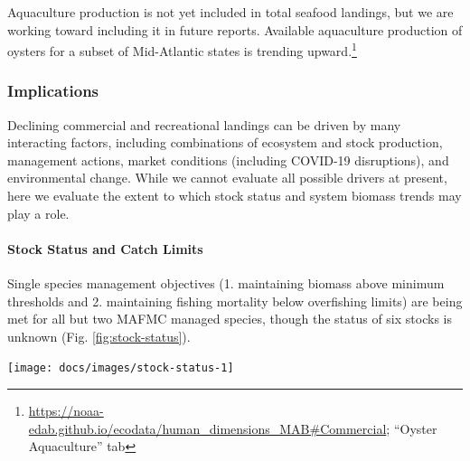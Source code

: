 \documentclass[
  10pt,
]{article}
\let\origfigure\figure
\let\endorigfigure\endfigure
\renewenvironment{figure}[1][2] {
    \expandafter\origfigure\expandafter[H]
} {
    \endorigfigure
}
\begin{document}
Aquaculture production is not yet included in total seafood landings,
but we are working toward including it in future reports. Available
aquaculture production of oysters for a subset of Mid-Atlantic states is
trending upward.\footnote{\url{https://noaa-edab.github.io/ecodata/human_dimensions_MAB\#Commercial};
  ``Oyster Aquaculture'' tab}

\hypertarget{implications}{%
\subsubsection{Implications}\label{implications}}

Declining commercial and recreational landings can be driven by many
interacting factors, including combinations of ecosystem and stock
production, management actions, market conditions (including COVID-19
disruptions), and environmental change. While we cannot evaluate all
possible drivers at present, here we evaluate the extent to which stock
status and system biomass trends may play a role.

\hypertarget{stock-status-and-catch-limits}{%
\paragraph{Stock Status and Catch
Limits}\label{stock-status-and-catch-limits}}

Single species management objectives (1. maintaining biomass above
minimum thresholds and 2. maintaining fishing mortality below
overfishing limits) are being met for all but two MAFMC managed species,
though the status of six stocks is unknown (Fig.
\ref{fig:stock-status}).

\begin{figure}

{\centering \texttt{[image: docs/images/stock-status-1]} 

}

\caption{Summary of single species status for MAFMC and jointly federally managed stocks (Spiny dogfish and both Goosefish). The dotted verticxal line is the target bioomass reference point of Bmsy. The dashed lines are the management trehsolds of one half Bmsy (vertical) or Fmsy (horizontal). Stocks in green are below the biomass threshold (overfished), stocks in orange are above the biomass threshold but below the biomass target, and stocks in purple are above the biomass target. Only one stock, Atlantic mackerel, has fishing mortality above the limit (subject to overfishing).}\label{fig:stock-status}
\end{figure}
\end{document}
